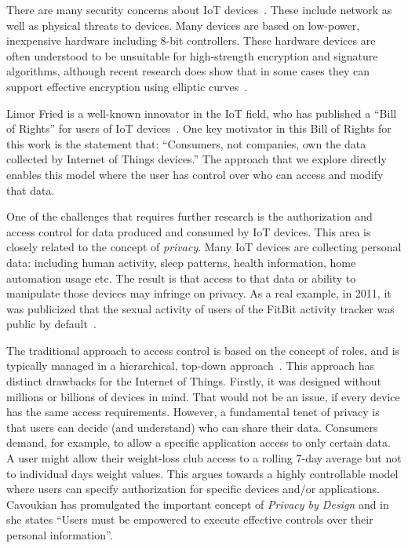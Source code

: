 \documentclass{llncs}
\begin{document}
There are many security concerns about IoT devices~\cite{roman2011securing, draft-garcia}. These include 
network as well as physical threats to devices. Many devices are based on low-power, inexpensive
hardware including 8-bit controllers. These hardware devices are often understood to be 
unsuitable for high-strength 
encryption and signature algorithms, although recent research does show that in some cases they can 
support effective encryption using elliptic curves~\cite{sethi2012end, comparingECCRSA}. 

Limor Fried is a well-known innovator in the IoT field, who has published a ``Bill of Rights'' for
users of IoT devices~\cite{fried-bill-of-rights}. One key motivator in this Bill of Rights for this work is the  
statement that: ``Consumers, not companies, own the data collected by Internet of Things devices.'' The  
approach that we explore directly enables this model where the user has control over who can 
access and modify that data.

One of the challenges that requires further research is the authorization and access control
for data produced and consumed by IoT devices. This area is closely related to the concept
of \emph{privacy}. Many IoT devices are collecting personal 
data: including human activity, sleep patterns, health information, home automation usage etc. The result 
is that access to that data or ability to manipulate those devices may infringe on privacy. As a real example, in 2011, it was publicized that the sexual activity of users of the FitBit activity tracker was public by default~\cite{fitbitsex}.

The traditional approach to access control is based on the concept of roles, and is typically
managed in a hierarchical, top-down approach~\cite{sandhu1994access}.
This approach has distinct drawbacks for the Internet of Things. Firstly, it was designed 
without millions or billions of devices in mind. That would not be an issue, if every device has the same 
access requirements. However, a fundamental tenet of privacy is that users can decide (and understand) who can
share their data. Consumers demand, for example, to allow a specific application 
access to only certain data. A user might allow their weight-loss club access to a rolling 7-day
average but not to individual days weight values. This argues towards a highly controllable model where users
can specify authorization for specific devices and/or applications. Cavoukian has promulgated
the important concept of \emph{Privacy by Design} and in~\cite{cavoukian2008privacy} she
states ``Users must be empowered to execute effective controls over their personal information''.
\end{document}
